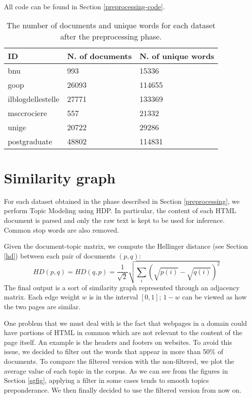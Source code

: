 All code can be found in Section \ref{preprocessing-code}.

\begin{table}[H]
    \begin{center}
        \begin{tabular}{ |l|l|l| }
            \hline
            ID                & N. of documents & N. of unique words \\
            \hline
            bnu               & 993             & 15336              \\
            \hline
            goop              & 26093           & 114655             \\
            \hline
            ilblogdellestelle & 27771           & 133369             \\
            \hline
            msccrociere       & 557             & 21332              \\
            \hline
            unige             & 20722           & 29286              \\
            \hline
            postgraduate      & 48802           & 114831             \\
            \hline
        \end{tabular}
    \end{center}
    \caption{
        The number of documents and unique words for each dataset after the preprocessing phase.
    }
    \label{table:dbprocdata}
\end{table}

\section{Similarity graph} \label{sgexp}
For each dataset obtained in the phase described in Section \ref{preprocessing},
we perform Topic Modeling using HDP. In particular, the content of each HTML document is
parsed and only the raw text is kept to be used for inference. Common stop words are also removed.

Given the document-topic matrix,
we compute the Hellinger distance (see Section \ref{hd}) between each pair of documents $(p, q)$:
\[\mathit{HD}(p, q) = \mathit{HD}(q, p) = \frac{1}{\sqrt{2}} \sqrt{\sum_i (\sqrt{p(i)} - \sqrt{q(i)})^2}\]
The final output is a sort of similarity graph represented through an adjacency matrix.
Each edge weight $w$ is in the interval $[0, 1]$;
$1-w$ can be viewed as how the two pages are similar.

One problem that we must deal with is the fact that
webpages in a domain could have portions of HTML in common which are not relevant to the content of the page itself.
An example is the headers and footers on websites.
To avoid this issue, we decided to filter out the words that appear in more than 50\% of documents.
To compare the filtered version with the non-filtered, we plot the average value of each topic in the corpus.
As we can see from the figures in Section \ref{sgfig}, applying a filter in some cases tends to smooth topics preponderance.
We then finally decided to use the filtered version from now on.


